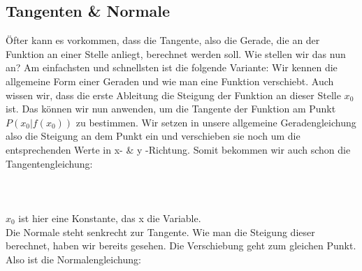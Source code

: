 \subsection{Tangenten \& Normale}
	Öfter kann es vorkommen, dass die Tangente, also die Gerade, die an der
	Funktion an einer Stelle anliegt, berechnet werden soll. Wie stellen wir das
	nun an? Am einfachsten und schnellsten ist die folgende Variante: Wir kennen
	die allgemeine Form einer Geraden und wie man eine Funktion verschiebt. Auch
	wissen wir, dass die erste Ableitung die Steigung der Funktion an dieser Stelle
	\(x_0\) ist. Das können wir nun anwenden, um die Tangente der Funktion am Punkt
	\(P(x_0|f(x_0))\) zu bestimmen. Wir setzen in unsere allgemeine
	Geradengleichung also die Steigung an dem Punkt ein und verschieben sie noch um
	die entsprechenden Werte in x- \& y -Richtung. Somit bekommen wir auch schon
	die Tangentengleichung:
	\\ \\
	\formel{\[t(x)=f'(x_0)\cdot (x-x_0)+f(x_0)\]}
	\\ \\
	\(x_0\) ist hier eine Konstante, das x die Variable.\\
	Die Normale steht senkrecht zur Tangente. Wie man die Steigung dieser
	berechnet, haben wir bereits gesehen. Die Verschiebung geht zum gleichen Punkt.
	Also ist die Normalengleichung:
	\\ \\
	\formel{\[n(x)=-\frac{1}{f'(x_0)}\cdot (x-x_0)+f(x_0)\]}
	
	
